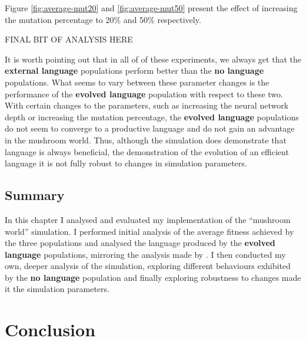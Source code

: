 \documentclass[12pt,a4paper,twoside,openright]{report}
\begin{document}
Figure \ref{fig:average-mut20} and \ref{fig:average-mut50} present the effect of increasing the mutation percentage to 20\% and 50\% respectively. 

FINAL BIT OF ANALYSIS HERE

It is worth pointing out that in all of of these experiments, we always get that the {\bf external language} populations perform better than the {\bf no language} populations. What seems to vary between these parameter changes is the performance of the {\bf evolved language} population with respect to these two. With certain changes to the parameters, such as increasing the neural network depth or increasing the mutation percentage, the {\bf evolved language} populations do not seem to converge to a productive language and do not gain an advantage in the mushroom world. Thus, although the simulation does demonstrate that language is always beneficial, the demonstration of the evolution of an efficient language it is not fully robust to changes in simulation parameters.

 \section{Summary}
 
 In this chapter I analysed and evaluated my implementation of the ``mushroom world'' simulation. I performed initial analysis of the average fitness achieved by the three populations and analysed the language produced by the {\bf evolved language} populations, mirroring the analysis made by \citet{Cangelosi1998}. I then conducted my own, deeper analysis of the simulation, exploring different behaviours exhibited by the {\bf no language} population and finally exploring robustness to changes made it the simulation parameters.


\chapter{Conclusion}
\end{document}
